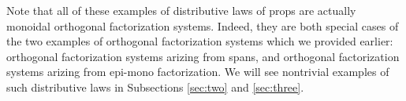 Note that all of these examples of distributive laws of props are actually  monoidal orthogonal factorization systems.  Indeed, they are both special cases of the two examples of orthogonal factorization systems which we provided earlier: orthogonal factorization systems arizing from spans, and orthogonal factorization systems arizing from epi-mono factorization.   We will see nontrivial examples of such distributive laws in Subsections \ref{sec:two} and \ref{sec:three}. 

%
%
%
%
%
